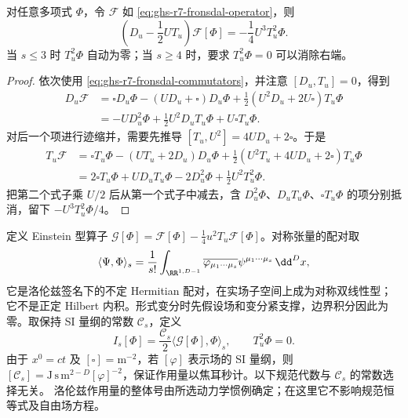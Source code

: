 \begin{proposition}\label{prop:ghs-r7-fronsdal-bianchi}
对任意多项式 $\Phi$，令 $\mathcal F$ 如 \cref{eq:ghs-r7-fronsdal-operator}，则
\begin{equation}\label{eq:ghs-r7-fronsdal-bianchi}
 \left(D_u-\frac12UT_u\right)\mathcal F[\Phi]
 =-\frac14U^3T_u^2\Phi.
\end{equation}
当 $s\le3$ 时 $T_u^2\Phi$ 自动为零；当 $s\ge4$ 时，要求 $T_u^2\Phi=0$ 可以消除右端。
\end{proposition}
\begin{proof}
依次使用 \cref{eq:ghs-r7-fronsdal-commutators}，并注意 $[D_u,T_u]=0$，得到
\begin{align*}
 D_u\mathcal F
 &=\square D_u\Phi-(UD_u+\square)D_u\Phi
  +\frac12(U^2D_u+2U\square)T_u\Phi\\
 &=-UD_u^2\Phi+\frac12U^2D_uT_u\Phi+U\square T_u\Phi.
\end{align*}
对后一个项进行迹缩并，需要先推导 $[T_u,U^2]=4UD_u+2\square$。于是
\begin{align*}
 T_u\mathcal F
 &=\square T_u\Phi-(UT_u+2D_u)D_u\Phi
 +\frac12(U^2T_u+4UD_u+2\square)T_u\Phi\\
 &=2\square T_u\Phi+UD_uT_u\Phi-2D_u^2\Phi
 +\frac12U^2T_u^2\Phi.
\end{align*}
把第二个式子乘 $U/2$ 后从第一个式子中减去，含 $D_u^2\Phi$、$D_uT_u\Phi$、$\square T_u\Phi$ 的项分别抵消，留下 $-U^3T_u^2\Phi/4$。
\end{proof}

定义 Einstein 型算子 $\mathcal G[\Phi]=\mathcal F[\Phi]-\tfrac14u^2T_u\mathcal F[\Phi]$。对称张量的配对取
\[
 \langle\Psi,\Phi\rangle_s
 =\frac1{s!}\int_{\RR^{1,D-1}}
 \overline{\varphi_{\mu_1\cdots\mu_s}}
 \psi^{\mu_1\cdots\mu_s}\,\dd^Dx,
\]
它是洛伦兹签名下的不定 Hermitian 配对，在实场子空间上成为对称双线性型；它不是正定 Hilbert 内积。形式变分时先假设场和变分紧支撑，边界积分因此为零。取保持 SI 量纲的常数 $\mathcal C_s$，定义
\begin{equation}\label{eq:ghs-r7-fronsdal-action}
 I_s[\Phi]=\frac{\mathcal C_s}{2}\langle\mathcal G[\Phi],\Phi\rangle_s,
 \qquad T_u^2\Phi=0.
\end{equation}
由于 $x^0=ct$ 及 $[\square]=\mathrm{m}^{-2}$，若 $[\varphi]$ 表示场的 SI 量纲，则 $[\mathcal C_s]=\mathrm{J}\,\mathrm{s}\,\mathrm{m}^{2-D}[\varphi]^{-2}$，保证作用量以焦耳秒计。以下规范代数与 $\mathcal C_s$ 的常数选择无关。
洛伦兹作用量的整体号由所选动力学惯例确定；在这里它不影响规范恒等式及自由场方程。

